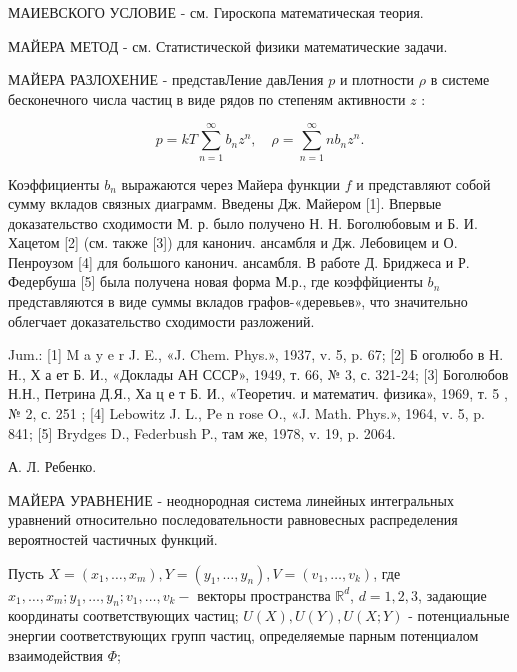 \documentclass[10pt]{article}
\begin{document}
МАИЕВСКОГО УСЛОВИЕ - см. Гироскопа математическая теория.



МАЙЕРА МЕТОД - см. Статистической физики математические задачи.



МАЙЕРА РАЗЛОХЕНИЕ - представЛение давЛения $p$ и плотности $\rho$ в системе бесконечного числа частиц в виде рядов по степеням активности $z$ :



\[

p=k T \sum_{n=1}^{\infty} b_{n} z^{n}, \quad \rho=\sum_{n=1}^{\infty} n b_{n} z^{n} .

\]



Коэффициенты $b_{n}$ выражаются через Майера функции $f$ и представляют собой сумму вкладов связных диаграмм. Введены Дж. Майером [1]. Впервые доказательство сходимости М. р. было получено Н. Н. Боголюбовым и Б. И. Хацетом [2] (см. также [3]) для канонич. ансамбля и Дж. Лебовицем и О. Пенроузом [4] для большого канонич. ансамбля. В работе Д. Бриджеса и Р. Федербуша [5] была получена новая форма М.р., где коэффйциенты $b_{n}$ представляются в виде суммы вкладов графов-«деревьев», что значительно облегчает доказательство сходимости разложений.



Jum.: [1] M a y e r J. E., «J. Chem. Phys.», 1937, v. 5, p. 67; [2] Б оголюбо в Н. Н., Х а ет Б. И., «Доклады АН СССР», 1949, т. 66, № 3, с. 321-24; [3] Боголюбов Н.Н., Петрина Д.Я., Ха ц е т Б. И., «Теоретич. и математич. физика», 1969, т. 5 , № 2, с. 251 ; [4] Lebowitz J. L., Pe n rose O., «J. Math. Phys.», 1964, v. 5, p. 841; [5] Brydges D., Federbush P., там же, 1978, v. 19, p. 2064.



А. Л. Ребенко.



МАЙЕРА УРАВНЕНИЕ - неоднородная система линейных интегральных уравнений относительно последовательности равновесных распределения вероятностей частичных функций.



Пусть $X=\left(x_{1}, \ldots, x_{m}\right), Y=\left(y_{1}, \ldots, y_{n}\right), V=\left(v_{1}, \ldots, v_{k}\right)$, где $x_{1}, \ldots, x_{m} ; y_{1}, \ldots, y_{n} ; v_{1}, \ldots, v_{k}-$ векторы пространства $\mathbb{R}^{d}$, $d=1,2,3$, задающие координаты соответствующих частиц; $U(X), U(Y), U(X ; Y)$ - потенциальные энергии соответствующих групп частиц, определяемые парным потенциалом взаимодействия $\Phi$;
\end{document}
